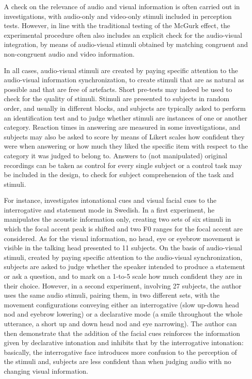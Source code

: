 \documentclass[output=paper]{langsci/langscibook}
\begin{document}
A check on the relevance of audio and visual information is often carried out in investigations, with audio-only and video-only stimuli included in perception tests. However, in line with the traditional testing of the McGurk effect, the experimental procedure often also includes an explicit check for the audio-visual integration, by means of audio-visual stimuli obtained by matching congruent and non-congruent audio and video information. 

In all cases, audio-visual stimuli are created by paying specific attention to the audio-visual information synchronization, to create stimuli that are as natural as possible and that are free of artefacts.  Short pre-tests may indeed be used to check for the quality of stimuli. Stimuli are presented to subjects in random order, and usually in different blocks, and subjects are typically asked to perform an identification test and to judge whether stimuli are instances of one or another category. Reaction times in answering are measured in some investigations, and subjects may also be asked to score by means of Likert scales how confident they were when answering or how much they liked the specific item with respect to the category it was judged to belong to. Answers to (not manipulated) original recordings can be taken as control for every single subject or a control task may be included in the design, to check for subject comprehension of the task and stimuli.

For instance, \citet{House2002} investigates intonational cues and visual facial cues to the interrogative and statement mode in Swedish. In a first experiment, he manipulates the acoustic information only, creating two sets of six stimuli in which the focal accent peak is shifted and two F0 ranges for the focal accent are considered. As for the visual information, no head, eye or eyebrow movement is visible in the talking head presented to 11 subjects. On the basis of audio-visual stimuli, created by paying specific attention to the audio-visual synchronization, subjects are asked to judge whether the speaker intended to produce a statement or ask a question, and to mark on a 1-to-5 scale how much confident they are in their choice. However, in a second experiment, involving 27 subjects, the author uses the same audio stimuli, pairing them, in two different sets, with the movement configurations conveying either an interrogative (slow up-down head nod and eyebrow lowering) or a declarative mode (a smile throughout the whole utterance, a short up and down head nod and eye narrowing). The author can then demonstrate that the addition of the facial cues reinforces the information given by declarative intonation and inhibits that by the interrogative intonation: basically, the interrogative face introduces more confusion to the perception of the stimuli and, subjects are less confident than when judging audio with no changing visual information.
\end{document}
